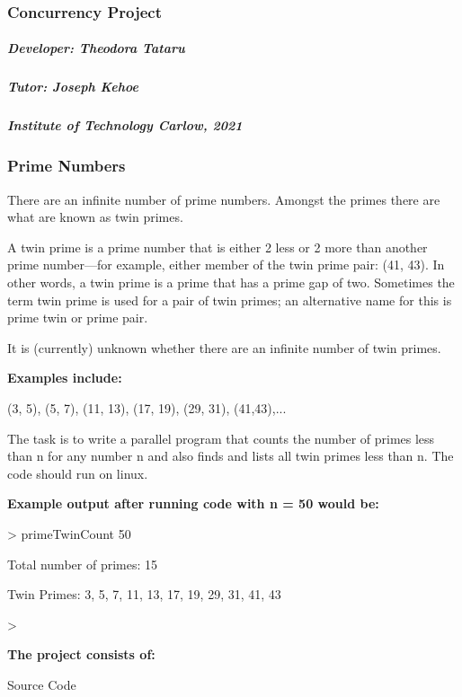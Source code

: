 \subsubsection*{Concurrency Project}

\subparagraph*{Developer\+: Theodora Tataru }

\subparagraph*{Tutor\+: Joseph Kehoe }

\subparagraph*{Institute of Technology Carlow, 2021 }

\subsubsection*{Prime Numbers}

There are an infinite number of prime numbers. Amongst the primes there are what are known as twin primes.

A twin prime is a prime number that is either 2 less or 2 more than another prime number—for example, either member of the twin prime pair\+: {\ttfamily (41, 43)}. In other words, a twin prime is a prime that has a prime gap of two. Sometimes the term twin prime is used for a pair of twin primes; an alternative name for this is prime twin or prime pair.

It is (currently) unknown whether there are an infinite number of twin primes.

{\bfseries Examples include\+: } 
\begin{DoxyCode}
(3, 5), (5, 7), (11, 13), (17, 19), (29, 31), (41,43),... 
\end{DoxyCode}


The task is to write a parallel program that counts the number of primes less than n for any number n and also finds and lists all twin primes less than n. The code should run on linux.

{\bfseries Example output after running code with n = 50 would be\+: }


\begin{DoxyCode}
>
primeTwinCount 50

Total number of primes: 15

Twin Primes: 3, 5, 7, 11, 13, 17, 19, 29, 31, 41, 43

>
\end{DoxyCode}


{\bfseries The project consists of\+: }


\begin{DoxyItemize}
\item Source Code
\end{DoxyItemize}

